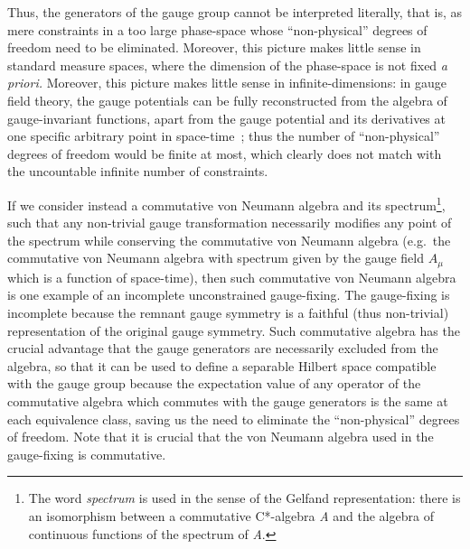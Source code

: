 \documentclass[11pt]{book}
\begin{document}
Thus, the generators of the gauge group cannot be interpreted literally,
that is, as mere constraints in a too large phase-space whose
``non-physical'' degrees of freedom need to be eliminated. Moreover,
this picture makes little sense in standard measure spaces, where the
dimension of the phase-space is not fixed \emph{a priori. }Moreover,
this picture makes little sense in infinite-dimensions: in gauge field
theory, the gauge potentials can be fully reconstructed from the algebra
of gauge-invariant functions, apart from the gauge potential and its
derivatives at one specific arbitrary point in
space-time~\cite{Giles1981Reconstruction}; thus the number of ``non-physical'' degrees of freedom would be
finite at most, which clearly does not match with the uncountable
infinite number of constraints.

If we consider instead a commutative von Neumann algebra and its
spectrum\footnote{The word \emph{spectrum} is used in the sense of the
  Gelfand representation: there is an isomorphism between a commutative
  C*-algebra {\emph{A}} and the algebra of continuous functions of the
  spectrum of {\emph{A}}.}, such that any non-trivial gauge
transformation necessarily modifies any point of the spectrum while
conserving the commutative von Neumann algebra (e.g.~the commutative von
Neumann algebra with spectrum given by the gauge field \(A_\mu\) which
is a function of space-time), then such commutative von Neumann algebra
is one example of an incomplete unconstrained gauge-fixing. The
gauge-fixing is incomplete because the remnant gauge symmetry is a
faithful (thus non-trivial) representation of the original gauge
symmetry. Such commutative algebra has the crucial advantage that the
gauge generators are necessarily excluded from the algebra, so that it
can be used to define a separable Hilbert space compatible with the
gauge group because the expectation value of any operator of the
commutative algebra which commutes with the gauge generators is the same
at each equivalence class, saving us the need to eliminate the
``non-physical'' degrees of freedom. Note that it is crucial that the
von Neumann algebra used in the gauge-fixing is commutative.
\end{document}
